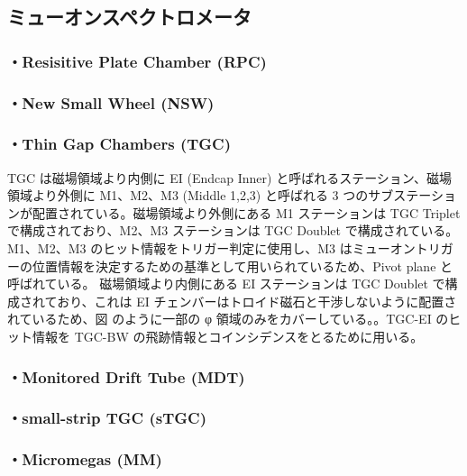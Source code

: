 \subsection{ミューオンスペクトロメータ}
\label{section2-2-4}

\subsubsection{・Resisitive Plate Chamber (RPC)}
\subsubsection{・New Small Wheel (NSW)}
\subsubsection{・Thin Gap Chambers (TGC)}
TGC は磁場領域より内側に EI (Endcap Inner) と呼ばれるステーション、磁場領域より外側に M1、M2、M3 (Middle 1,2,3) と呼ばれる 3 つのサブステーションが配置されている。磁場領域より外側にある M1 ステーションは TGC Triplet で構成されており、M2、M3 ステーションは TGC Doublet で構成されている。
M1、M2、M3 のヒット情報をトリガー判定に使用し、M3 はミューオントリガーの位置情報を決定するための基準として用いられているため、Pivot plane と呼ばれている。
磁場領域より内側にある EI ステーションは TGC Doublet で構成されており、これは EI チェンバーはトロイド磁石と干渉しないように配置されているため、図  のように一部の φ 領域のみをカバーしている。。TGC-EI のヒット情報を TGC-BW の飛跡情報とコインシデンスをとるために用いる。

\subsubsection{・Monitored Drift Tube (MDT)}
\subsubsection{・small-strip TGC (sTGC)}
\subsubsection{・Micromegas (MM)}









